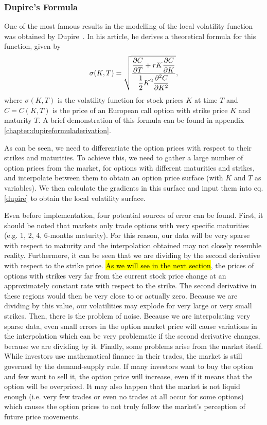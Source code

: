 \subsubsection{Dupire's Formula}
\label{subsubsection:Dupire}
One of the most famous results in the modelling of the local volatility function was obtained by Dupire~\cite{Dupire}. In his article, he derives a theoretical formula for this function, given by
\begin{equation}\label{dupire}
\sigma(K,T)=\sqrt{\frac{\displaystyle\pdv{C}{T}+rK\pdv{C}{K}}{\displaystyle\frac{1}{2}K^2\pdv{^2C}{K^2}}},
\end{equation}
\noindent where $\sigma(K,T)$ is the volatility function for stock prices $K$ at time $T$ and $C=C(K,T)$ is the price of an European call option with strike price $K$ and maturity $T$.
A brief demonstration of this formula can be found in appendix \ref{chapter:dupireformuladerivation}.


As can be seen, we need to differentiate the option prices with respect to their strikes and maturities. To achieve this, we need to gather a large number of option prices from the market, for options with different maturities and strikes, and interpolate between them to obtain an option price surface (with $K$ and $T$ as variables). We then calculate the gradients in this surface and input them into eq. \ref{dupire} to obtain the local volatility surface.

Even before implementation, four potential sources of error can be found.
First, it should be noted that markets only trade options with very specific maturities (e.g. 1, 2, 4, 6-months maturity). For this reason, our data will be very sparse with respect to maturity and the interpolation obtained may not closely resemble reality.
Furthermore, it can be seen that we are dividing by the second derivative with respect to the strike price. \hl{As we will see in the next section}, the prices of options with strikes very far from the current stock price change at an approximately constant rate with respect to the strike. The second derivative in these regions would then be very close to or actually zero. Because we are dividing by this value, our volatilities may explode for very large or very small strikes.
Then, there is the problem of noise. Because we are interpolating very sparse data, even small errors in the option market price will cause variations in the interpolation which can be very problematic if the second derivative changes, because we are dividing by it.
Finally, some problems arise from the market itself. While investors use mathematical finance in their trades, the market is still governed by the demand-supply rule. If many investors want to buy the option and few want to sell it, the option price will increase, even if it means that the option will be overpriced. It may also happen that the market is not liquid enough (i.e. very few trades or even no trades at all occur for some options) which causes the option prices to not truly follow the market's perception of future price movements.



